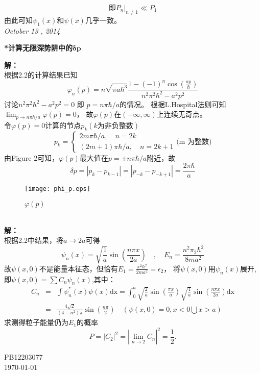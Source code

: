 \documentclass[a4paper]{article}
\begin{document}
\begin{CJK*}{UTF8}{song}
{$$        \mbox{即}
        \displaystyle P_{n}|_{n\neq 1}\ll P_{1}
        $$
    由此可知$\psi_{1}(x)$和$\psi (x)$几乎一致。
    }\\[40pt]  
    \Large{\emph{October 13 , 2014}}\\[15pt]
    \begin{CJK*}{UTF8}{kai}
    \noindent \textbf{*计算无限深势阱中的}$\mathbf{\delta p}$\\[8pt]
    \end{CJK*}
    {
    \noindent\textbf{解：}\\[8pt]
    \indent 根据2.2的计算结果已知
    $$\varphi_{n}(p) = n \sqrt{\pi a \hbar^{3}}
        \frac{1 - (-1)^{n} \cos (\frac{a p}{\hbar}) }{n^{2} {\pi}^{2} {\hbar}^{2} - a^{2} p^{2}}
        $$
    \indent 讨论$ n^{2} {\pi}^{2} {\hbar}^{2} - a^{2} p^{2} = 0$ 即 $p = n \pi\hbar / a$的情况。
    根据L.Hospital法则可知$\displaystyle \lim_{p\rightarrow n \pi\hbar / a} \varphi(p) = 0$，
    故$\varphi(p)$在$(-\infty,\infty)$上连续无奇点。\\[8pt]
    \indent 令$\varphi (p)=0$计算的节点$p_{k}(k\mbox{为非负整数})$
    \[
    p_{k}=\left\{
    \begin{array}{ll}
        \displaystyle 2 m\pi\hbar / a  ,  \quad n = 2 k\\[12pt]
        \displaystyle (2 m + 1)\pi\hbar / a  ,  \quad n = 2 k + 1
    \end{array}
    \right.
    \mbox{(m 为整数)}
    \]   
    \indent 由Figure 2可知，$\varphi(p)$最大值在$p = \pm n \pi\hbar / a$附近，故
    $$\delta p = |p_{k} - p_{k - 1}| = |p_{-k} - p_{-k + 1}| = \frac{2\pi\hbar}{a}$$
    \begin{figure}[ht]
      \centering
      \texttt{[image: phi\_p.eps]}\\
      \caption{$\varphi(p)$}
    \end{figure}
    }\\[20pt]  
     \textbf{解：}\\[12pt]
    {
    根据2.2中结果，将$a\rightarrow 2a$可得
    $$\psi_{n}(x) = \sqrt{\frac{1}{a}}\sin (\frac{n\pi x}{2a})\quad , \quad E_{n} = \frac{n^{2}\pi_{2}\hbar^{2}}{8 m a^{2}}$$
    故$\psi(x,0)$不是能量本征态，但恰有$\displaystyle E_{1}=\frac{\pi^{2}\hbar^{2}}{2 m a^{2}}=\epsilon_{2}$，
        将$\psi(x,0)$用$\psi_{n}(x)$展开,即$\psi (x,0) = \sum C_{n} \psi_{n}(x)$,其中：
    \begin{eqnarray}
    C_{n}  & = &  \int \psi_{n}^{*} (x) \psi (x) \mathrm{d x} 
        = \int_{0}^{a} \sqrt{\frac{2}{a}}\sin (\frac{\pi x}{a})\sqrt{\frac{1}{a}}\sin (\frac{n\pi x}{2a})\mathrm{d x}\nonumber\\
        & = & \frac{4\sqrt{2}}{(4 - n^{2})\pi}\sin(\frac{n\pi}{2})
        \quad (\psi(x,0)=0,x<0 \bigcup x>a )\nonumber    
    \end{eqnarray}
    求测得粒子能量仍为$E_{1}$的概率
    $$P = |C_{2}|^{2} = |\lim_{n\rightarrow 2} C_{n}|^{2} = \frac{1}{2}.$$
    }    
    \end{CJK*}
    \begin{CJK*}{UTF8}{kai}
        \begin{flushright}
            \small PB12203077\\
            \small \today
        \end{flushright}
    \end{CJK*}
\end{document}
